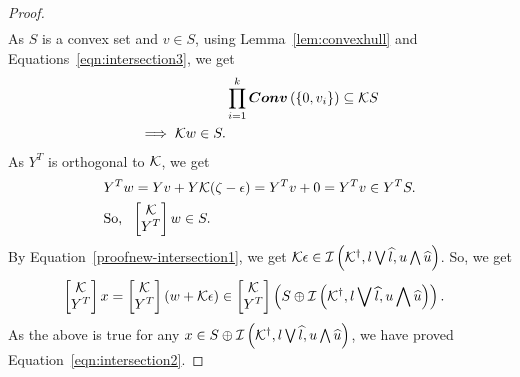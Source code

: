 \begin{proof}
\begin{align*}
\end{align*}
%
As $S$ is a convex set and $v\in S$, using Lemma~\ref{lem:convexhull} and
Equations~\ref{eqn:intersection3}, we get
%
\begin{align*}
& \prod_{i=1}^k\bm{Conv}\left(\left\{0,v_i\right\}\right)\subseteq \mathcal{K} S\\
\implies \mathcal{K} w\in S.
\end{align*}
%
As $Y^T$ is orthogonal to $\mathcal{K}$, we get
%
\begin{align*}
& Y^Tw=Yv+Y\mathcal{K}(\zeta-\epsilon)=Y^Tv+0=Y^Tv\in Y^TS.\\
& \text{So,}~~\left[\begin{matrix}\mathcal{K}\\ Y^T\end{matrix}\right]w\in S.
\end{align*}
%
By
Equation~\ref{proofnew-intersection1}, we get
$\mathcal{K}\epsilon\in\mathit{\operatorname{\mathcal{I}}}\left({\mathcal{K}}^\dagger,l\bigvee \widehat{l},u\bigwedge \widehat{u}\right)$.
So, we get
%
\begin{align*}
& \left[\begin{matrix}\mathcal{K}\\ Y^T\end{matrix}\right]x=\left[\begin{matrix}\mathcal{K}\\ Y^T\end{matrix}\right]\left(w+\mathcal{K}\epsilon\right)\in\left[\begin{matrix}\mathcal{K}\\ Y^T\end{matrix}\right]\left(S\oplus\mathit{\operatorname{\mathcal{I}}}\left({\mathcal{K}}^\dagger,l\bigvee \widehat{l},u\bigwedge \widehat{u}\right)\right).
\end{align*}
%
As the above is true for any $x\in
S\oplus\mathit{\operatorname{\mathcal{I}}}\left({\mathcal{K}}^\dagger,l\bigvee \widehat{l},u\bigwedge \widehat{u}\right)$,
we have proved Equation~\ref{eqn:intersection2}.
\end{proof}
%
